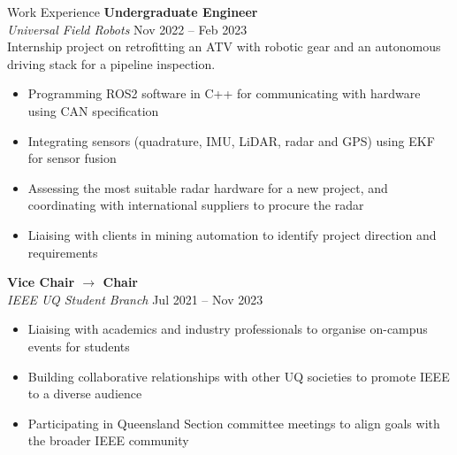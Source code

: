 \documentclass{custom-resume}
\begin{document}
\begin{minipage}[t]{0.61\textwidth}
\begin{section*}{Work Experience}
    \textbf{Undergraduate Engineer} \\[8pt]

    \textit{Universal Field Robots} \hfill Nov 2022 -- Feb 2023\\[8pt]

    Internship project on retrofitting an ATV with robotic gear and an autonomous driving stack for a pipeline inspection.

    \begin{itemize}[leftmargin=*]
      \item Programming ROS2 software in C++ for communicating with hardware using CAN specification
      \item Integrating sensors (quadrature, IMU, LiDAR, radar and GPS) using EKF for sensor fusion
      \item Assessing the most suitable radar hardware for a new project, and coordinating with international suppliers to procure the radar
      \item Liaising with clients in mining automation to identify project direction and requirements
    \end{itemize}

    \vspace{8pt}

    \textbf{Vice Chair $\rightarrow$ Chair} \\[8pt]

    \textit{IEEE UQ Student Branch} \hfill Jul 2021 -- Nov 2023

    \begin{itemize}[leftmargin=*]
      \item Liaising with academics and industry professionals to organise on-campus events for students
      \item Building collaborative relationships with other UQ societies to promote IEEE to a diverse audience
      \item Participating in Queensland Section committee meetings to align goals with the broader IEEE community
    \end{itemize}

  \end{section*}

\end{minipage}

\FooterRule
\newpage

\end{document}
